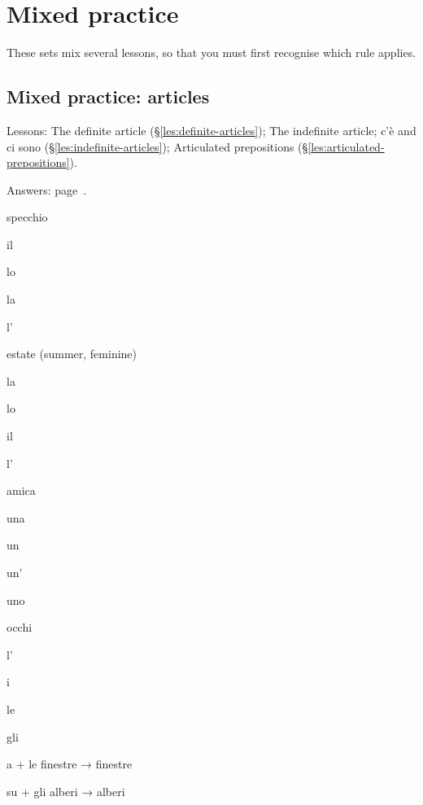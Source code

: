 \documentclass[11pt,a4paper,twoside,openright]{book}
\newcommand{\blank}{\underline{\hspace{2.6cm}}}
\begin{document}
\chapter{Mixed practice}\label{mixed}
These sets mix several lessons, so that you must first recognise which rule applies.\par

\section{Mixed practice: articles}\label{set:mixed-articles}
{\small Lessons: The definite article (\S\ref{les:definite-articles}); The indefinite article; c'è and ci sono (\S\ref{les:indefinite-articles}); Articulated prepositions (\S\ref{les:articulated-prepositions}).}\par
{\color{muted}\small Answers: page~\pageref{ans:set:mixed-articles}.}

\begin{exercises}
\item\label{ex:mix-art-1}\relax \blank{} specchio\par\nopagebreak\begin{options}
\item\relax il
\item\relax lo
\item\relax la
\item\relax l'
\end{options}
\item\label{ex:mix-art-2}\relax \blank{} estate (summer, feminine)\par\nopagebreak\begin{options}
\item\relax la
\item\relax lo
\item\relax il
\item\relax l'
\end{options}
\item\label{ex:mix-art-3}\relax \blank{} amica\par\nopagebreak\begin{options}
\item\relax una
\item\relax un
\item\relax un'
\item\relax uno
\end{options}
\item\label{ex:mix-art-4}\relax \blank{} occhi\par\nopagebreak\begin{options}
\item\relax l'
\item\relax i
\item\relax le
\item\relax gli
\end{options}
\item\label{ex:mix-art-5}\relax a + le finestre → \blank{} finestre
\item\label{ex:mix-art-6}\relax su + gli alberi → \blank{} alberi
\end{exercises}
\end{document}
